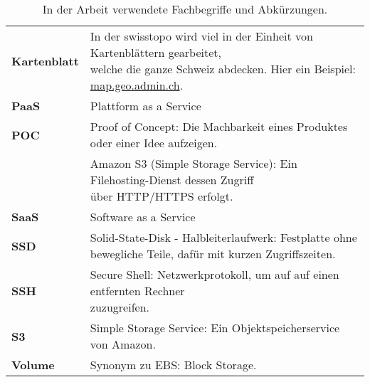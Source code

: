 \begin{table}[!htbp]
\begin{tabular}{p{}p{}}
    \textbf{Kartenblatt} & \makecell[l]{In der swisstopo wird viel in der Einheit von Kartenblättern gearbeitet,\\ welche die ganze Schweiz abdecken. Hier ein Beispiel: \href{https://s.geo.admin.ch/8b5f3f6721}{map.geo.admin.ch}.}\\
	\textbf{PaaS} & Plattform as a Service\\
	\textbf{POC} & Proof of Concept: Die Machbarkeit eines Produktes oder einer Idee aufzeigen.\\
	\makecell[l]{\textbf{S3}} & \makecell[l]{Amazon S3 (Simple Storage Service): Ein Filehosting-Dienst dessen Zugriff\\ über HTTP/HTTPS erfolgt.}\\
	\textbf{SaaS} & Software as a Service\\
	\textbf{SSD} &  Solid-State-Disk - Halbleiterlaufwerk: Festplatte ohne bewegliche Teile, dafür mit kurzen Zugriffszeiten.\\
	\textbf{SSH} & \makecell[l]{Secure Shell: Netzwerkprotokoll, um auf auf einen entfernten Rechner\\ zuzugreifen.}\\
	\textbf{S3} & Simple Storage Service: Ein Objektspeicherservice von Amazon.\\
	\textbf{Volume} & Synonym zu EBS: Block Storage.\\
\end{tabular}
\caption{\label{tab:fachbegriffe}In der Arbeit verwendete Fachbegriffe und Abkürzungen.}
\end{table}